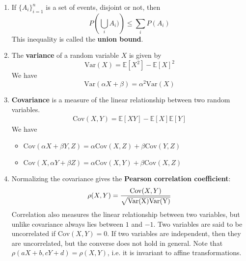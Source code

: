 \documentclass[10pt]{article}
\begin{document}
\begin{multicols}{2}
\begin{addmargin}[0.8em]{0.5em}
\begin{enumerate}[label=(\alph*)]
    \item If $\{ A_i \}_{i=1}^{n}$ is a set of events, disjoint or not, then
    $$
    P \left( \bigcup_i A_i) \right) \leq \sum_{i} P(A_i)
    $$
    This inequality is called the \textbf{union bound}.
    
    \item The \textbf{variance} of a random variable $X$ is given by
    $$
    \text{Var}(X) = \mathbb{E}[X^2] - \mathbb{E}[X]^2
    $$
    We have
    $$
    \text{Var}(\alpha X + \beta) = \alpha^2 \text{Var}(X)
    $$
    \item \textbf{Covariance} is a measure of the linear relationship between two random variables.
    \begin{align*}
    \text{Cov}(X,Y) = \mathbb{E}[XY] - \mathbb{E}[X] \mathbb{E}[Y]
    \end{align*}
    We have
    \begin{itemize}
    \item $\text{Cov}(\alpha X + \beta Y, Z) = \alpha \text{Cov}(X, Z) + \beta \text{Cov}(Y, Z)$
    \item $\text{Cov}(X, \alpha Y + \beta Z) = \alpha \text{Cov}(X, Y) + \beta \text{Cov}(X, Z)$
    \end{itemize}
    
    \item Normalizing the covariance gives the \textbf{Pearson correlation coefficient}:
    \begin{align*}
    \rho(X, Y) = \frac{\text{Cov}(X,Y)}{\sqrt{\text{Var(X)\text{Var(Y)}}}}
    \end{align*}
    Correlation also measures the linear relationship between two variables, but unlike covariance always lies between $1$ and $-1$. Two variables are said to be uncorrelated if $\text{Cov}(X, Y) = 0$. If two variables are independent, then they are uncorrelated, but the converse does not hold in general. Note that $\rho(aX + b, cY + d) = \rho(X,Y)$, i.e. it is invariant to affine transformations.
    

\end{enumerate}
\end{addmargin}
\end{multicols}
\end{document}

